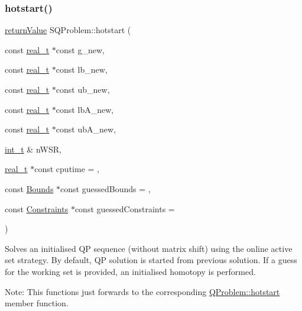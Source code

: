 \subsubsection{\texorpdfstring{hotstart()}{hotstart()}\hspace{0.1cm}{\footnotesize\ttfamily [4/5]}}
{\footnotesize\ttfamily \hyperlink{_message_handling_8hpp_a81d556f613bfbabd0b1f9488c0fa865e}{return\+Value} S\+Q\+Problem\+::hotstart (\begin{DoxyParamCaption}\item[{const \hyperlink{qp_o_a_s_e_s__wrapper_8h_a0d00e2b3dfadee81331bbb39068570c4}{real\+\_\+t} $\ast$const}]{g\+\_\+new,  }\item[{const \hyperlink{qp_o_a_s_e_s__wrapper_8h_a0d00e2b3dfadee81331bbb39068570c4}{real\+\_\+t} $\ast$const}]{lb\+\_\+new,  }\item[{const \hyperlink{qp_o_a_s_e_s__wrapper_8h_a0d00e2b3dfadee81331bbb39068570c4}{real\+\_\+t} $\ast$const}]{ub\+\_\+new,  }\item[{const \hyperlink{qp_o_a_s_e_s__wrapper_8h_a0d00e2b3dfadee81331bbb39068570c4}{real\+\_\+t} $\ast$const}]{lb\+A\+\_\+new,  }\item[{const \hyperlink{qp_o_a_s_e_s__wrapper_8h_a0d00e2b3dfadee81331bbb39068570c4}{real\+\_\+t} $\ast$const}]{ub\+A\+\_\+new,  }\item[{\hyperlink{_types_8hpp_ab6fd6105e64ed14a0c9281326f05e623}{int\+\_\+t} \&}]{n\+W\+SR,  }\item[{\hyperlink{qp_o_a_s_e_s__wrapper_8h_a0d00e2b3dfadee81331bbb39068570c4}{real\+\_\+t} $\ast$const}]{cputime = {},  }\item[{const \hyperlink{class_bounds}{Bounds} $\ast$const}]{guessed\+Bounds = {},  }\item[{const \hyperlink{class_constraints}{Constraints} $\ast$const}]{guessed\+Constraints = {} }\end{DoxyParamCaption})}

Solves an initialised QP sequence (without matrix shift) using the online active set strategy. By default, QP solution is started from previous solution. If a guess for the working set is provided, an initialised homotopy is performed.

Note\+: This functions just forwards to the corresponding \hyperlink{class_q_problem_a524c59e7638d982e46501e7695ce1693}{Q\+Problem\+::hotstart} member function.

